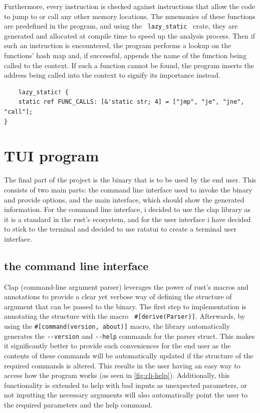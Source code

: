 Furthermore, every instruction is checked against instructions that allow the code to jump to or call any other memory locations.
The mnemonics of these functions are predefined in the program, and using the \verb| lazy_static | \cite{lobel_rust-lang-nurserylazy-static_2020} crate, they are generated and allocated at compile time to speed up the analysis process.
Then if such an instruction is encountered, the program performs a lookup on the functions' hash map and, if successful, appends the name of the function being called to the context.
If such a function cannot be found, the program inserts the address being called into the context to signify its importance instead.

\begin{lstlisting}
    lazy_static! {
    static ref FUNC_CALLS: [&'static str; 4] = ["jmp", "je", "jne", "call"];
}
\end{lstlisting}

\section{TUI program}

The final part of the project is the binary that is to be used by the end user. 
This consists of two main parts: the command line interface used to invoke the binary and provide options, and the main interface, which should show the generated information.
For the command line interface, i decided to use the clap \cite{clap-rs_team_clap-rsclap_2024} library as it is a standard in the rust's ecosystem, and for the user interface i have decided to stick to the terminal and decided to use ratatui \cite{ratatui_team_ratatuiratatui_2024} to create a terminal user interface.

\subsection{the command line interface}

Clap (command-line argument parser) leverages the power of rust's macros and annotations to provide a clear yet verbose way of defining the structure of argument that can be passed to the binary.
The first step to implementation is annotating the structure with the macro \verb| #[derive(Parser)]|.
Afterwards, by using the \verb|#[command(version, about)]| macro, the library automatically generates the \verb|--version| and \verb|--help| commands for the parser struct.
This makes it significantly better to provide such conveniences for the end user as the contents of these commands will be automatically updated if the structure of the required commands is altered.
This results in the user having an easy way to access how the program works (as seen in \autoref{fig:cli-help}).
Additionally, this functionality is extended to help with bad inputs as unexpected parameters, or not inputting the necessary arguments will also automatically point the user to the required parameters and the help command.

